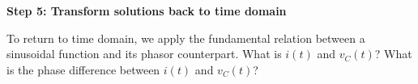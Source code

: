 \begin{enumerate}
\qitem \textbf{Step 5: Transform solutions back to time domain}

To return to time domain, we apply the fundamental relation between a sinusoidal function and its phasor counterpart.
What is $i(t)$ and $v_C(t)$? What is the phase difference between $i(t)$ and $v_C(t)$? 



\end{enumerate}
